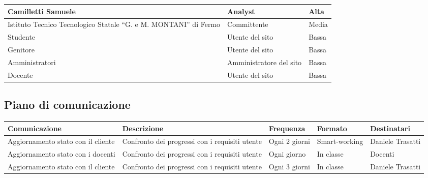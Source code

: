 \documentclass{article}
\begin{document}
\begin{flushleft}
\begin{tabular}{ |p{4cm}|p{4cm}|p{4cm}|  }
			Camilletti Samuele&Analyst&Alta\\
			
			\hline
			
			Istituto Tecnico Tecnologico Statale “G. e M. MONTANI” di Fermo&Committente&Media\\
			
			\hline
			
			Studente   & Utente del sito & Bassa \\
			
			\hline
			
			Genitore   & Utente del sito & Bassa \\
			
			\hline
			
			Amministratori  & Amministratore del sito & Bassa\\	
			
			\hline
			
			Docente & Utente del sito & Bassa\\
			
			\hline
			
		\end{tabular}
		
		\vspace{3mm}
		
		\subsection{Piano di comunicazione}
		
		\begin{tabular}{ |p{3cm}|p{3.5cm}|p{2cm}|p{1.5cm}|p{2cm}|  }
			
			\hline
			
			Comunicazione&Descrizione &Frequenza&Formato&Destinatari\\
			
			\hline
			
			Aggiornamento stato con il cliente&Confronto dei progressi con i requisiti utente&Ogni 2 giorni&Smart-working&Daniele Trasatti\\
			
			\hline
			
			
			Aggiornamento stato con i docenti&Confronto dei progressi con i requisiti utente&Ogni giorno&In classe&Docenti\\
			
			\hline
			
			Aggiornamento stato con il cliente&Confronto dei progressi con i requisiti utente&Ogni 3 giorni&In classe&Daniele Trasatti\\


\end{tabular}
\end{flushleft}
\end{document}
